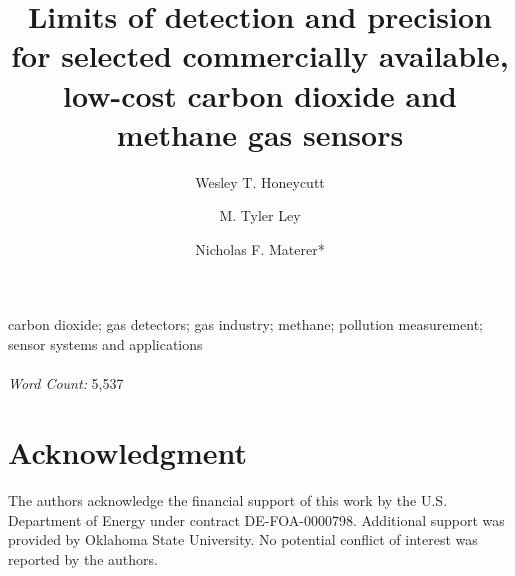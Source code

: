 \documentclass[times]{joehreview}
\begin{document}
	
	\begin{frontmatter}
		\title{Limits of detection and precision for selected commercially available, low-cost carbon dioxide and methane gas sensors}
		
		\author{Wesley T. Honeycutt}
		\author{M. Tyler Ley}
		\author{Nicholas F. Materer*}	
		
		\begin{keyword}
			carbon dioxide; gas detectors; gas industry; methane; pollution measurement; sensor systems and applications
			\\~\\
			\textit{Word Count:} 5,537
		\end{keyword}
		
	\end{frontmatter}

	\section*{Acknowledgment}
	The authors acknowledge the financial support of this work by the U.S. Department of Energy under contract DE-FOA-0000798.  Additional support was provided by Oklahoma State University. No potential conflict of interest was reported by the authors.
\end{document}
